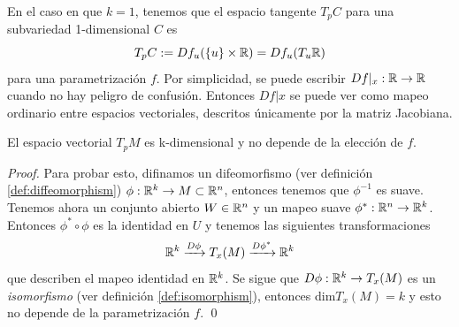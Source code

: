 \begin{example}
    En el caso en que $k=1$, tenemos que el espacio tangente $T_{p}C$ para una subvariedad 1-dimensional
    $C$ es
    $$ T_{p}C := Df_{u}(\{u\} \times \mathbb{R})=Df_{u}(T_{u}\mathbb{R}) $$
    para una parametrizaci\'on $f$. Por simplicidad, se puede escribir $Df|_{x}: \mathbb{R} \rightarrow \mathbb{R}$
    cuando no hay peligro de confusi\'on. Entonces $Df|x$ se puede ver como mapeo
    ordinario entre espacios vectoriales, descritos \'unicamente por la matriz Jacobiana.
\end{example}

\begin{proposition}
    El espacio vectorial $T_{p}M$ es k-dimensional y no depende de la elecci\'on de $f$.
\end{proposition}
\begin{proof}
    Para probar esto, difinamos un difeomorfismo (ver definici\'on \ref{def:diffeomorphism}) $\phi: \mathbb{R}^{k} \rightarrow M \subset \mathbb{R}^{n}$,
    entonces tenemos que $\phi^{-1}$ es suave. Tenemos ahora un conjunto abierto $W \in \mathbb{R}^{n}$ y
    un mapeo suave $\phi^{*}:\mathbb{R}^{n} \rightarrow \mathbb{R}^{k}$. Entonces $\phi^{*} \circ \phi$ es la
    identidad en $U$ y tenemos las siguientes transformaciones
    $$\mathbb{R}^{k} \xrightarrow{D\phi} T_{x}(M) \xrightarrow{D\phi^{*}} \mathbb{R}^{k} $$
    que describen el mapeo identidad en $\mathbb{R}^{k}$. Se sigue que $D\phi:\mathbb{R}^{k} \rightarrow T_{x}(M)$
    es un \emph{isomorfismo} (ver definici\'on \ref{def:isomorphism}), entonces dim$T_{x}(M)=k$ y
    esto no depende de la parametrizaci\'on $f$. \qed
\end{proof}


